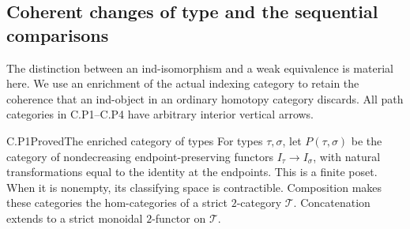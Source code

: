 \subsection{Coherent changes of type and the sequential comparisons}

The distinction between an ind-isomorphism and a weak equivalence is material here. We use an enrichment of the actual indexing category to retain the coherence that an ind-object in an ordinary homotopy category discards. All path categories in C.P1--C.P4 have arbitrary interior vertical arrows.

\begin{result}{C.P1}{Proved}{The enriched category of types}
For types $\tau,\sigma$, let $P(\tau,\sigma)$ be the category of nondecreasing endpoint-preserving functors $I_\tau\to I_\sigma$, with natural transformations equal to the identity at the endpoints. This is a finite poset. When it is nonempty, its classifying space is contractible. Composition makes these categories the hom-categories of a strict $2$-category $\mathcal T$. Concatenation extends to a strict monoidal $2$-functor on $\mathcal T$.
\end{result}
